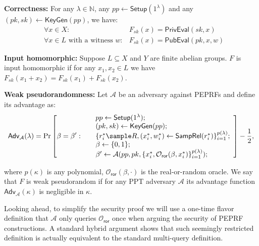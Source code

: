\documentclass[a4paper,10pt]{article}
\begin{document}
\begin{trivlist}
\item \textbf{Correctness:} For any $\lambda \in \mathbb{N}$, 
    any $pp \leftarrow \mathsf{Setup}(1^\lambda)$ and any $(pk, sk) \leftarrow \mathsf{KeyGen}(pp)$, we have:
    \begin{eqnarray*}
        & \forall x \in X: & F_{sk}(x) = \mathsf{PrivEval}(sk, x)\\
        & \forall x \in L \text{~with a witness~} w: & F_{sk}(x) = \mathsf{PubEval}(pk, x, w)
    \end{eqnarray*} 

\item \textbf{Input homomorphic:} Suppose $L \subseteq X$ and $Y$ are finite abelian groups. 
    $F$ is input homomorphic if for any $x_1, x_2 \in L$ we have $F_{sk}(x_1+x_2) = F_{sk}(x_1)+F_{sk}(x_2)$.    

\item \textbf{Weak pseudorandomness:} Let $\mathcal{A}$ be an adversary 
    against PEPRFs and define its advantage as:
    \begin{displaymath}
        \mathsf{Adv}_\mathcal{A}(\lambda) =
            \Pr \left[\beta = \beta':~ 
                \begin{array}{ll}
                    & pp \leftarrow \mathsf{Setup}(1^\lambda);\\
                    & (pk, sk) \leftarrow \mathsf{KeyGen}(pp);\\
                    & \{r_i^* \sample R, (x_i^*, w_i^*) \leftarrow \mathsf{SampRel}(r_i^*)\}_{i=1}^{p(\lambda)};\\
                    & \beta \leftarrow \{0,1\};\\   
                    & \beta' \leftarrow \mathcal{A}(pp, pk,  
                    \{x_i^*, \mathcal{O}_\mathsf{ror}(\beta, x_i^*)\}_{i=1}^{p(\lambda)});
                \end{array} 
            \right] - \frac{1}{2},
    \end{displaymath}
\end{trivlist}
where $p(\kappa)$ is any polynomial, 
$\mathcal{O}_\mathsf{ror}(\beta, \cdot)$ is the real-or-random oracle. 
We say that $F$ is weak pseudorandom if for any PPT adversary 
$\mathcal{A}$ its advantage function $\mathsf{Adv}_\mathcal{A}(\kappa)$ is negligible in $\kappa$. 

Looking ahead, to simplify the security proof we will use a one-time flavor definition 
that $\mathcal{A}$ only queries $\mathcal{O}_\mathsf{ror}$ once when arguing the security of PEPRF constructions. 
A standard hybrid argument shows that such seemingly restricted definition is actually equivalent to 
the standard multi-query definition.
\end{document}

